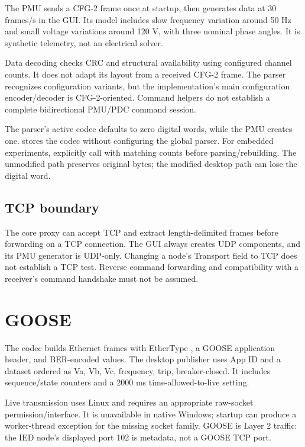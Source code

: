 The PMU sends a CFG-2 frame once at startup, then generates data at 30 frames/s in the GUI. Its model includes slow frequency variation around 50 Hz and small voltage variations around 120 V, with three nominal phase angles. It is synthetic telemetry, not an electrical solver.

Data decoding checks CRC and structural availability using configured channel counts. It does not adapt its layout from a received CFG-2 frame. The parser recognizes configuration variants, but the implementation's main configuration encoder/decoder is CFG-2-oriented. Command helpers do not establish a complete bidirectional PMU/PDC command session.

The parser's active codec defaults to zero digital words, while the PMU creates one.  stores the codec without configuring the global parser. For embedded experiments, explicitly call  with matching counts before parsing/rebuilding. The unmodified path preserves original bytes; the modified desktop path can lose the digital word.

\subsection*{TCP boundary}
The core proxy can accept TCP and extract length-delimited frames before forwarding on a TCP connection. The GUI always creates UDP components, and its PMU generator is UDP-only. Changing a node's Transport field to TCP does not establish a TCP test. Reverse command forwarding and compatibility with a receiver's command handshake must not be assumed.

\section*{GOOSE}
The codec builds Ethernet frames with EtherType , a GOOSE application header, and BER-encoded values. The desktop publisher uses App ID  and a dataset ordered as Va, Vb, Vc, frequency, trip, breaker-closed. It includes sequence/state counters and a 2000 ms time-allowed-to-live setting.

Live transmission uses Linux  and requires an appropriate raw-socket permission/interface. It is unavailable in native Windows; startup can produce a worker-thread exception for the missing socket family. GOOSE is Layer 2 traffic: the IED node's displayed port 102 is metadata, not a GOOSE TCP port.

